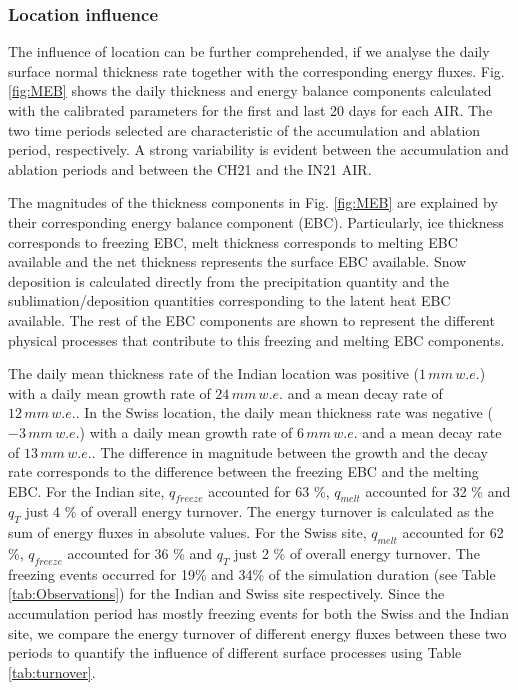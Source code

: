 \documentclass[utf8]{frontiersSCNS}
\begin{document}
\subsubsection{Location influence}

The influence of location can be further comprehended, if we analyse the daily surface normal thickness rate
together with the corresponding energy fluxes. Fig.  \ref{fig:MEB} shows the daily thickness and energy balance
components calculated with the calibrated parameters for the first and last 20 days for each AIR. The two time
periods selected are characteristic of the accumulation and ablation period, respectively. A strong variability is
evident between the accumulation and ablation periods and between the CH21 and the IN21 AIR.

The magnitudes of the thickness components in Fig. \ref{fig:MEB} are explained by their corresponding
energy balance component (EBC).  Particularly, ice thickness corresponds to freezing EBC, melt thickness
corresponds to melting EBC available and the net thickness represents the surface EBC available.  Snow
deposition is calculated directly from the precipitation quantity and the sublimation/deposition quantities
corresponding to the latent heat EBC available.  The rest of the EBC components are shown to represent the
different physical processes that contribute to this freezing and melting EBC components.

The daily mean thickness rate of the Indian location was positive ($1\, mm \,w.e.$) with a daily mean growth
rate of $24\, mm \,w.e.$ and a mean decay rate of $12\, mm \,w.e.$. In the Swiss location, the daily mean
thickness rate was negative ($-3\, mm \,w.e.$) with a daily mean growth rate of $6\, mm \,w.e.$ and a mean decay
rate of $13\, mm \,w.e.$. The difference in magnitude between the growth and the decay rate corresponds to the
difference between the freezing EBC and the melting EBC. For the Indian site, $q_{freeze}$ accounted for 63 \%,
$q_{melt}$ accounted for 32 \% and $q_{T}$ just 4 \% of overall energy turnover. The energy turnover is calculated
as the sum of energy fluxes in absolute values. For the Swiss site, $q_{melt}$ accounted for 62 \%, $q_{freeze}$
accounted for 36 \% and $q_{T}$ just 2 \% of overall energy turnover. The freezing events occurred for 19\% and
34\% of the simulation duration (see Table \ref{tab:Observations}) for the Indian and Swiss site respectively.
Since the accumulation period has mostly freezing events for both the Swiss and the Indian site, we compare the
energy turnover of different energy fluxes between these two periods to quantify the influence of different
surface processes using Table \ref{tab:turnover}.
\end{document}
